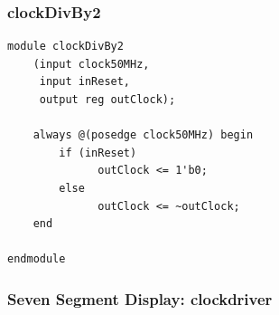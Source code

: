 \documentclass[a4paper]{article}
\begin{document}
\subsubsection{clockDivBy2}

\begin{Verbatim}
module clockDivBy2
	(input clock50MHz,
	 input inReset,
	 output reg outClock);

	always @(posedge clock50MHz) begin
		if (inReset)
			  outClock <= 1'b0;
		else
			  outClock <= ~outClock;
	end

endmodule
\end{Verbatim}

\subsubsection{Seven Segment Display: clockdriver}
\end{document}

